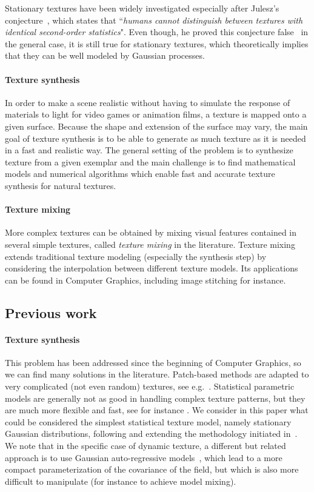 Stationary textures have been widely investigated especially after Julesz's conjecture~\cite{julesz62}, which states that ``\emph{humans cannot distinguish between textures with identical second-order statistics}". Even though, he proved this conjecture false~\cite{Julesz71} in the general case, it is still true for stationary textures, which theoretically implies that they can be well modeled by Gaussian processes.

\paragraph{Texture synthesis}
In order to make a scene realistic without having to simulate the response of materials to light for video games or animation films, a texture is mapped onto a given surface. Because the shape and extension of the surface may vary, the main goal of texture synthesis is to be able to generate as much texture as it is needed in a fast and realistic way. The general setting of the problem is to synthesize texture from a given exemplar and the main challenge is to find mathematical models and numerical algorithms which enable fast and accurate texture synthesis for natural textures.

\paragraph*{Texture mixing}
More complex textures can be obtained by mixing visual features contained in several simple textures, called \emph{texture mixing} in the literature. Texture mixing extends traditional texture modeling (especially the synthesis step) by considering the interpolation between different texture models. Its applications can be found in Computer Graphics, including image stitching for instance.


\subsection{Previous work}
\label{sec:prev_work}

\paragraph{Texture synthesis}
This problem has been addressed since the beginning of Computer Graphics, so we can find many solutions in the literature.
Patch-based methods are adapted to very complicated (not even random) textures, see e.g.~\cite{efros-nonparam-sampling}. Statistical parametric models are generally not as good in handling complex texture patterns, but they are much more flexible and fast, see for instance \cite{portilla-parametric-model}.
We consider in this paper what could be considered the simplest statistical texture model, namely stationary Gaussian distributions, following and extending the methodology initiated in~\cite{galerne-ieee}. We note that in the specific case of dynamic texture, a different but related approach is to use Gaussian auto-regressive models~\cite{doretto-ijcv}, which lead to a more compact parameterization of the covariance of the field, but which is also more difficult to manipulate (for instance to achieve model mixing).

